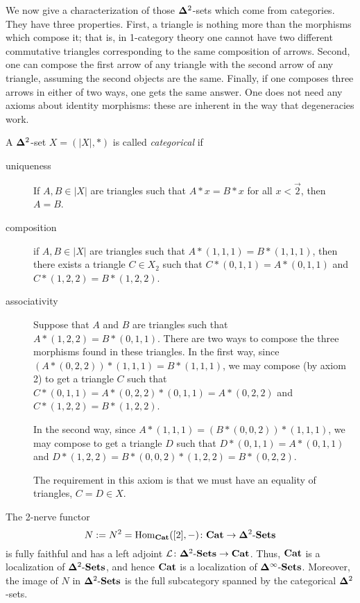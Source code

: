 \documentclass{amsart}
\def\Del{{\bf \Delta}}
\def\dashSets{{\tn{-}\Sets}}
\def\Delinf{{\Del^\infty}}
\def\DSets{{\Delinf\dashSets}}
\def\D2Sets{{\Del^2\dashSets}}
\renewcommand{\vect}[1]{\overrightarrow{#1}}
\begin{document}
We now give a characterization of those $\Del^2$-sets which come from categories.  They have three properties.  First, a triangle is nothing more than the morphisms which compose it; that is, in 1-category theory one cannot have two different commutative triangles corresponding to the same composition of arrows.  Second, one can compose the first arrow of any triangle with the second arrow of any triangle, assuming the second objects are the same.  Finally, if one composes three arrows in either of two ways, one gets the same answer.  One does not need any axioms about identity morphisms: these are inherent in the way that degeneracies work.

\begin{definition}

A $\Del^2$-set $X=(|X|,*)$ is called {\em categorical} if \begin{description}\item[uniqueness] If $A,B\in|X|$ are triangles such that $A*x=B*x$ for all $x<\vect{2}$, then $A=B$.\item[composition] if $A,B\in |X|$ are triangles such that $A*(1,1,1)=B*(1,1,1)$, then there exists a triangle $C\in X_2$ such that $C*(0,1,1)=A*(0,1,1)$ and $C*(1,2,2)=B*(1,2,2)$.\item[associativity] Suppose that $A$ and $B$ are triangles such that $A*(1,2,2)=B*(0,1,1)$.   There are two ways to compose the three morphisms found in these triangles.  In the first way, since $(A*(0,2,2))*(1,1,1)=B*(1,1,1)$, we may compose (by axiom 2) to get a triangle $C$ such that $C*(0,1,1)=A*(0,2,2)*(0,1,1)=A*(0,2,2)$ and $C*(1,2,2)=B*(1,2,2)$.  

In the second way, since $A*(1,1,1)=(B*(0,0,2))*(1,1,1)$, we may compose to get a triangle $D$ such that $D*(0,1,1)=A*(0,1,1)$ and $D*(1,2,2)=B*(0,0,2)*(1,2,2)=B*(0,2,2)$.  

The requirement in this axiom is that we must have an equality of triangles, $C=D\in X$.

\end{description}

\end{definition}

\begin{theorem}

The 2-nerve functor $$N:=N^2=\Hom_\Cat([2],-)\taking\Cat\to\D2Sets$$ is fully faithful and has a left adjoint $\mcL\taking\D2Sets\to\Cat$.  Thus, ${\bf Cat}$ is a localization of $\D2Sets$, and hence ${\bf Cat}$ is a localization of $\DSets$.  Moreover, the image of $N$ in $\D2Sets$ is the full subcategory spanned by the categorical $\Del^2$-sets.

\end{theorem}
\end{document}
